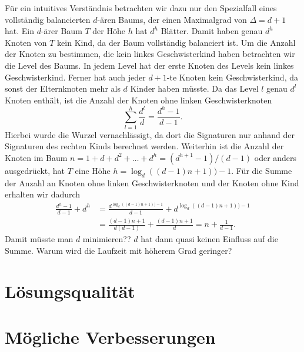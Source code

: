 Für ein intuitives Verständnis betrachten wir dazu nur den Spezialfall eines vollständig balancierten $d$\hyp ären Baums, der einen Maximalgrad von $\Delta = d + 1$ hat.
Ein $d$\hyp ärer Baum $T$ der Höhe $h$ hat $d^h$ Blätter.
Damit haben genau $d^h$ Knoten von $T$ kein Kind, da der Baum vollständig balanciert ist.
Um die Anzahl der Knoten zu bestimmen, die kein linkes Geschwisterkind haben betrachten wir die Level des Baums.
In jedem Level hat der erste Knoten des Levels kein linkes Geschwisterkind.
Ferner hat auch jeder $d+1$\hyp te Knoten kein Geschwisterkind, da sonst der Elternknoten mehr als $d$ Kinder haben müsste.
Da das Level $l$ genau $d^{l}$ Knoten enthält, ist die Anzahl der Knoten ohne linken Geschwisterknoten
\begin{equation*}
    \sum_{l=1}^{h} \frac{d^l}{d} = \frac{d^h - 1}{d - 1}.
\end{equation*}
Hierbei wurde die Wurzel vernachlässigt, da dort die Signaturen nur anhand der Signaturen des rechten Kinds berechnet werden.
Weiterhin ist die Anzahl der Knoten im Baum $n = 1 + d + d^2 + \ldots + d^h = (d^{h+1} - 1)/(d - 1)$ oder anders ausgedrückt, hat $T$ eine Höhe $h = \log_d((d-1)n + 1)) - 1$.
Für die Summe der Anzahl an Knoten ohne linken Geschwisterknoten und der Knoten ohne Kind erhalten wir dadurch
\begin{equation*}
    \begin{aligned}
        \frac{d^h - 1}{d - 1} + d^h & = \frac{d^{\log_d((d-1)n + 1)) - 1}}{d - 1} + d^{\log_d((d-1)n + 1)) - 1} \\
        & = \frac{(d-1)n + 1}{d(d-1)} + \frac{(d-1)n + 1}{d} = n + \frac{1}{d-1}.
    \end{aligned}
\end{equation*}
Damit müsste man $d$ minimieren?? $d$ hat dann quasi keinen Einfluss auf die Summe. Warum wird die Laufzeit mit höherem Grad geringer?

\section{Lösungsqualität}
\section{Mögliche Verbesserungen}

